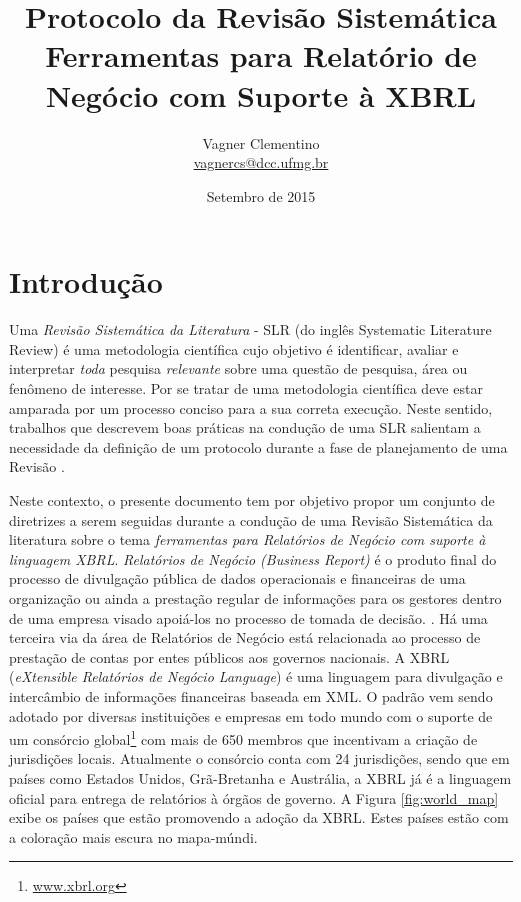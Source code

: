 \documentclass{article}
\title{Protocolo da Revisão Sistemática\\
Ferramentas para Relatório de Negócio com Suporte à XBRL
}
\author{Vagner Clementino \\
       \url{vagnercs@dcc.ufmg.br}}
\date{Setembro de  2015}
\begin{document}
\maketitle

\section{Introdução}
\label{sec:intro}

Uma \textit{Revisão Sistemática da Literatura} - SLR (do inglês Systematic Literature Review) é uma
metodologia científica cujo objetivo é identificar, avaliar e interpretar
\textit{toda} pesquisa \textit{relevante} sobre uma questão de
pesquisa, área ou fenômeno de
interesse\cite{keele2007guidelines,wohlin2012experimentation}. Por se tratar de uma metodologia científica deve estar amparada por um processo conciso para a sua correta execução. Neste sentido, trabalhos que descrevem boas práticas na condução de uma SLR salientam a necessidade da definição de um protocolo durante a fase de planejamento de uma Revisão \cite{keele2007guidelines, biolchini2005systematic}.

Neste contexto, o presente documento tem por objetivo propor um conjunto de diretrizes a serem seguidas durante a condução de uma Revisão Sistemática da literatura sobre o tema \textit{ferramentas para Relatórios de Negócio com suporte à linguagem XBRL}. \textit{Relatórios  de Negócio (Business Report)} é o produto final do  processo de divulgação pública de dados operacionais e financeiras de uma organização ou ainda a prestação regular de informações para os gestores dentro de uma empresa visado apoiá-los no processo de tomada de decisão.
\cite{lymer1999business}. Há uma terceira via da área de  Relatórios de Negócio está relacionada ao processo de prestação de contas por entes públicos aos governos nacionais. A XBRL (\textit{eXtensible Relatórios de Negócio Language}) é uma linguagem para divulgação e intercâmbio de informações financeiras baseada em XML\cite{xbrl_conceitos_aplicacoes}. O padrão vem sendo adotado por diversas instituições e empresas em todo mundo com o suporte de um consórcio global\footnote{\url{www.xbrl.org}} com mais de 650 membros que incentivam a criação de jurisdições locais. Atualmente o consórcio conta com 24 jurisdições, sendo que em países como  Estados Unidos, Grã-Bretanha e Austrália, a XBRL já é a linguagem oficial para entrega
de relatórios à órgãos de governo. A Figura \ref{fig:world_map} exibe os países que estão promovendo a adoção da XBRL. Estes países estão com a coloração mais escura no mapa-múndi.
\end{document}
